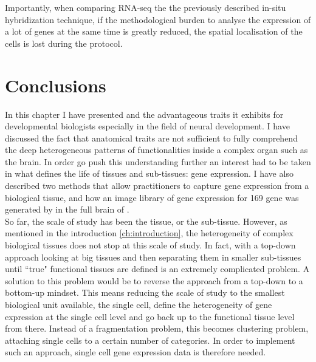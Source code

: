     Importantly, when comparing RNA-seq the the previously described in-situ hybridization technique, if the methodological burden to analyse the expression of a lot of genes at the same time is greatly reduced, the spatial localisation of the cells is lost during the protocol.\\
    
\section{Conclusions}
     
     In this chapter I have presented \platyfull{} and the advantageous traits it exhibits for developmental biologists especially in the field of neural development. I have discussed the fact that anatomical traits are not sufficient to fully comprehend the deep heterogeneous patterns of functionalities inside a complex organ such as the brain. In order go push this understanding further an interest had to be taken in what defines the life of tissues and sub-tissues: gene expression. I have also described two methods that allow practitioners to capture gene expression from a biological tissue, and how an image library  of gene expression for 169 gene was generated by \cite{Tomer10} in the full brain of \platy{}.\\
     
	So far, the scale of study has been the tissue, or the sub-tissue. However, as mentioned in the introduction \ref{ch:introduction}, the heterogeneity of complex biological tissues does not stop at this scale of study. In fact, with a top-down approach looking at big tissues and then separating them in smaller sub-tissues until ``true" functional tissues are defined is an extremely complicated problem. A solution to this problem would be to reverse the approach from a top-down to a bottom-up mindset. This means reducing the scale of study to the smallest biological unit available, the single cell, define the heterogeneity of gene expression at the single cell level and go back up to the functional tissue level from there. Instead of a fragmentation problem, this becomes clustering problem, attaching single cells to a certain number of categories. In order to implement such an approach, single cell gene expression data is therefore needed.

%
%
%
%
%



